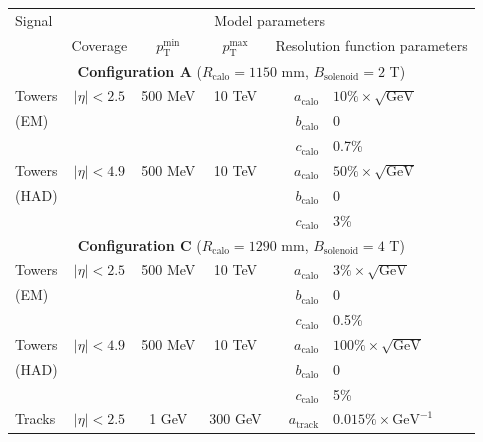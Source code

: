 \documentclass[11pt,letterpaper]{article}
\newcommand{\GeV}{\text{GeV}}
\newcommand{\ptmin}{\ensuremath{p_{\text{T}}^{\text{min}}}}
\newcommand{\ptmax}{\ensuremath{p_{\text{T}}^{\text{max}}}}
\newcommand{\acalo}{\ensuremath{a_{\text{calo}}}}
\newcommand{\bcalo}{\ensuremath{b_{\text{calo}}}}
\newcommand{\ccalo}{\ensuremath{c_{\text{calo}}}}
\newcommand{\atrk}{\ensuremath{a_{\text{track}}}}
\begin{document}
\begin{table}\centering
\renewcommand{\arraystretch}{1.25}
\begin{tabular}{|l|c|c|c|r@{\ =\ }l|}
\hline
Signal  & \multicolumn{5}{c|}{Model parameters}    \\ \cline{2-6}                      
        & Coverage
        & \ptmin
        & \ptmax 
        & \multicolumn{2}{c|}{Resolution function parameters} \\
\hline
\multicolumn{6}{|c|}{\textbf{Configuration A} ($R_{\text{calo}} = 1150$ mm, $B_{\text{solenoid}} = 2$ T)} \\
\hline
Towers     & $|\eta| < 2.5$ & 500 MeV &  10 TeV   & \acalo & $10\%\times\sqrt{\GeV}$                  \\ 
(EM)       &                &         &           & \bcalo & 0                                        \\
           &                &         &           & \ccalo & 0.7\%                                    \\
Towers     & $|\eta| < 4.9$ & 500 MeV &  10 TeV   & \acalo & $50\%\times\sqrt{\GeV}$                  \\
(HAD)      &                &         &           & \bcalo & 0                                        \\
           &                &         &           & \ccalo & 3\%                                      \\
\hline 
\multicolumn{6}{|c|}{\textbf{Configuration C} ($R_{\text{calo}} = 1290$ mm, $B_{\text{solenoid}} = 4$ T)} \\
\hline
Towers     & $|\eta| < 2.5$ & 500 MeV &  10 TeV   & \acalo & $3\%\times\sqrt{\GeV}$                   \\
(EM)       &                &         &           & \bcalo & 0                                        \\
           &                &         &           & \ccalo & 0.5\%                                    \\
Towers     & $|\eta| < 4.9$ & 500 MeV &  10 TeV   & \acalo & $100\%\times\sqrt{\GeV}$                 \\
(HAD)      &                &         &           & \bcalo & 0                                        \\
           &                &         &           & \ccalo & 5\%                                      \\
Tracks     & $|\eta| < 2.5$ &  1 GeV  &  300 GeV  & \atrk  & $0.015\%\times\GeV^{-1}$                  \\

\end{tabular}
\end{table}
\end{document}
